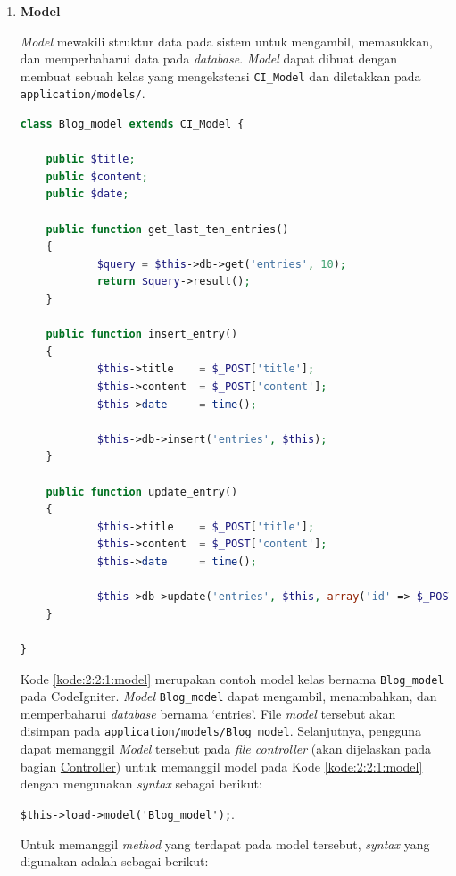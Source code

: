 \documentclass[a4paper,twoside]{article}
\begin{document}
\begin{enumerate}
\begin{enumerate}
		            \begin{enumerate}
			            \item \textbf{Model}
			                  \label{sub:2:2:1:model}

			                  \textit{Model} mewakili struktur data pada sistem untuk mengambil, memasukkan, dan memperbaharui data pada \textit{database}. \textit{Model} dapat dibuat dengan membuat sebuah kelas yang mengekstensi \verb|CI_Model| dan diletakkan pada \verb|application/models/|.

			                  \begin{lstlisting}[language=php, caption=Contoh \textit{model}, label=kode:2:2:1:model]
class Blog_model extends CI_Model {

	public $title;
	public $content;
	public $date;

	public function get_last_ten_entries()
	{
			$query = $this->db->get('entries', 10);
			return $query->result();
	}

	public function insert_entry()
	{
			$this->title    = $_POST['title'];
			$this->content  = $_POST['content'];
			$this->date     = time();

			$this->db->insert('entries', $this);
	}

	public function update_entry()
	{
			$this->title    = $_POST['title'];
			$this->content  = $_POST['content'];
			$this->date     = time();

			$this->db->update('entries', $this, array('id' => $_POST['id']));
	}

}
\end{lstlisting}

			                  Kode \ref{kode:2:2:1:model} merupakan contoh model kelas bernama \verb|Blog_model| pada CodeIgniter. \textit{Model} \verb|Blog_model| dapat mengambil, menambahkan, dan memperbaharui \textit{database} bernama `entries'. File \textit{model} tersebut akan disimpan pada \verb|application/models/Blog_model|. Selanjutnya, pengguna dapat memanggil \textit{Model} tersebut pada \textit{file controller} (akan dijelaskan pada bagian \hyperref[sub:2:2:3:Controller]{Controller}) untuk memanggil model pada Kode \ref{kode:2:2:1:model} dengan mengunakan \textit{syntax} sebagai berikut:

			                  \begin{center}
				                  \verb|$this->load->model('Blog_model');|.
			                  \end{center}

			                  Untuk memanggil \textit{method} yang terdapat pada model tersebut, \textit{syntax} yang digunakan adalah sebagai berikut:


\end{enumerate}
\end{enumerate}
\end{enumerate}
\end{document}
